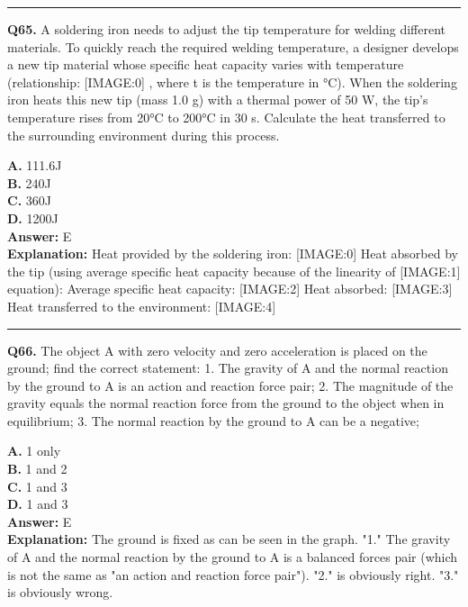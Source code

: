 \documentclass[12pt]{article}
\begin{document}
\hrule
\vspace{1em}


\noindent
\textbf{Q65.} A soldering iron needs to adjust the tip temperature for welding different materials. To quickly reach the required welding temperature, a designer develops a new tip material whose specific heat capacity varies with temperature (relationship:
[IMAGE:0]
, where t is the temperature in °C). When the soldering iron heats this new tip (mass 1.0 g) with a thermal power of 50 W, the tip's temperature rises from 20°C to 200°C in 30 s.
Calculate the heat transferred to the surrounding environment during this process.



\textbf{A.} 111.6J \\
\textbf{B.} 240J \\
\textbf{C.} 360J \\
\textbf{D.} 1200J \\

\textbf{Answer:} E \\
\textbf{Explanation:} Heat provided by the soldering iron:
[IMAGE:0]
Heat absorbed by the tip (using average specific heat capacity because of the linearity of
[IMAGE:1]
equation):
Average specific heat capacity:
[IMAGE:2]
Heat absorbed:
[IMAGE:3]
Heat transferred to the environment:
[IMAGE:4]

\hrule
\vspace{1em}


\noindent
\textbf{Q66.} The object A with zero velocity and zero acceleration is placed on the ground; find the correct statement:
1.
The gravity of A and the normal reaction by the ground to A is an action and reaction force pair;
2.
The magnitude of the gravity equals the normal reaction force from the ground to the object when in equilibrium;
3.
The normal reaction by the ground to A can be a negative;



\textbf{A.} 1 only \\
\textbf{B.} 1 and 2 \\
\textbf{C.} 1 and 3 \\
\textbf{D.} 1 and 3 \\

\textbf{Answer:} E \\
\textbf{Explanation:} The ground is fixed as can be seen in the graph. "1." The gravity of A and the normal reaction by the ground to A is a balanced forces pair (which is not the same as "an action and reaction force pair"). "2." is obviously right. "3." is obviously wrong.
\end{document}

